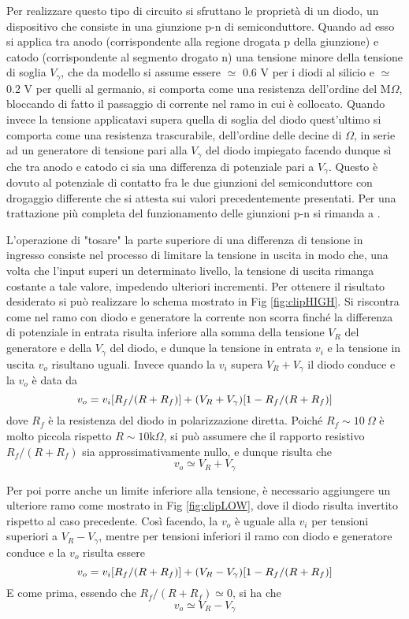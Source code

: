 \documentclass[a4paper,11pt]{article}
\begin{document}
	Per realizzare questo tipo di circuito si sfruttano le proprietà di un diodo, un dispositivo che consiste in una giunzione p-n di semiconduttore. Quando ad esso si applica tra anodo (corrispondente alla regione drogata p della giunzione) e catodo (corrispondente al segmento drogato n) una tensione minore della tensione di soglia $V_\gamma$, che da modello si assume essere $\simeq$ 0.6 V per i diodi al silicio e $\simeq$ 0.2 V per quelli al germanio, si comporta come una resistenza dell'ordine del M$\Omega$, bloccando di fatto il passaggio di corrente nel ramo in cui è collocato. Quando invece la tensione applicatavi supera quella di soglia del diodo quest'ultimo si comporta come una resistenza trascurabile, dell'ordine delle decine di $\Omega$, in serie ad un generatore di tensione pari alla $V_\gamma$ del diodo impiegato facendo dunque sì che tra anodo e catodo ci sia una differenza di potenziale pari a $V_\gamma$. Questo è dovuto al potenziale di contatto fra le due giunzioni del semiconduttore con drogaggio differente che si attesta sui valori precedentemente presentati. Per una trattazione più completa del funzionamento delle giunzioni p-n si rimanda a \cite{6773080}.
	
	L'operazione di "tosare" la parte superiore di una differenza di tensione in ingresso consiste nel processo di limitare la tensione in uscita in modo che, una volta che l'input superi un determinato livello, la tensione di uscita rimanga costante a tale valore, impedendo ulteriori incrementi. Per ottenere il risultato desiderato si può realizzare lo schema mostrato in Fig \ref{fig:clipHIGH}. Si riscontra come nel ramo con diodo e generatore la corrente non scorra finché la differenza di potenziale in entrata risulta inferiore alla somma della tensione $V_R$ del generatore e della $V_\gamma$ del diodo,  e dunque la tensione in entrata $v_i$ e la tensione in uscita $v_o$ risultano uguali. Invece quando la $v_i$ supera $V_R + V_\gamma$ il diodo conduce e la $v_o$ è data da
	\begin{equation}
		\centering
		v_o = v_i [R_f/(R+R_f)] + (V_R + V_\gamma) [1-R_f/(R+R_f)] 
		\label{eq:v_out1}
	\end{equation}
	dove $R_f$ è la resistenza del diodo in polarizzazione diretta. Poiché $R_f \sim 10 \ \Omega$ è molto piccola rispetto $R \sim 10$k$\Omega$, si può assumere che il rapporto resistivo $R_f/(R+R_f)$ sia approssimativamente nullo, e dunque risulta che $$ v_o \simeq V_R + V_\gamma $$
	
	Per poi porre anche un limite inferiore alla tensione, è necessario aggiungere un ulteriore ramo come mostrato in Fig \ref{fig:clipLOW}, dove il diodo risulta invertito rispetto al caso precedente. Così facendo, la $v_o$ è uguale alla $v_i$ per tensioni superiori a $V_R - V_\gamma$, mentre per tensioni inferiori il ramo con diodo e generatore conduce e la $v_o$ risulta essere
	\begin{equation}
		\centering 
		v_o = v_i [R_f/(R+R_f)] + (V_R - V_\gamma) [1-R_f/(R+R_f)]
		\label{eq:v_out2}
	\end{equation}
	E come prima, essendo che $R_f/(R+R_f) \simeq 0$, si ha che $$ v_o \simeq V_R - V_\gamma $$   
	
\end{document}
